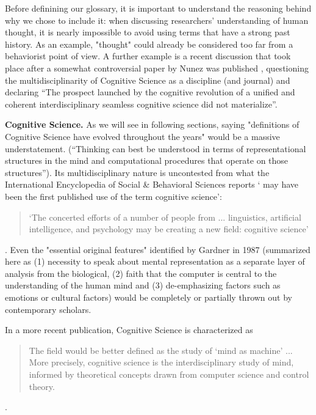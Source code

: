 \documentclass[../main.tex]{subfiles}
\begin{document}
Before definining our glossary, it is important to understand the reasoning behind why we chose to include it: when discussing researchers' understanding of human thought, it is nearly impossible to avoid using terms that have a strong past history. As an example, "thought" could already be considered too far from a behaviorist point of view. A further example is a recent discussion that took place after a somewhat controversial paper by Nunez was published \cite{nunezWhatHappenedCognitive2019}, questioning the multidisciplinarity of Cognitive Science as a discipline (and journal) and declaring \enquote{The prospect launched by the cognitive revolution of a unified and coherent interdisciplinary seamless cognitive science did not materialize}.


\vspace{5pt}
\textbf{Cognitive Science.} As we will see in following sections, saying "definitions of Cognitive Science have evolved throughout the years" would be a massive understatement. (“Thinking can best be understood in terms of representational structures in the mind and computational procedures that operate on those structures”). Its multidisciplinary nature is uncontested from what the International Encyclopedia of Social \& Behavioral Sciences \cite{InternationalEncyclopediaSocial} reports \enquote*{ may have been the first published use of the term cognitive science}:
\begin{quote}
    ‘The concerted efforts of a number of people from ... linguistics, artificial intelligence, and psychology may be creating a new field: cognitive science’
\end{quote}. Even the "essential original features" identified by Gardner in 1987 \cite{gardnerMindNewScience1987} (summarized here as (1) necessity to speak about mental representation as a separate layer of analysis from the biological, (2) faith that the computer is central to the understanding of the human mind and (3) de-emphasizing factors such as emotions or cultural factors) would be completely or partially thrown out by contemporary scholars.

In a more recent publication\cite{bodenMindMachineHistory2008}, Cognitive Science is characterized as
\begin{quote}
    The field would be better defined as the study of ‘mind as machine’ ... More precisely, cognitive science is the interdisciplinary study of mind, informed by theoretical concepts drawn from computer science and control theory.
\end{quote}.
\end{document}
